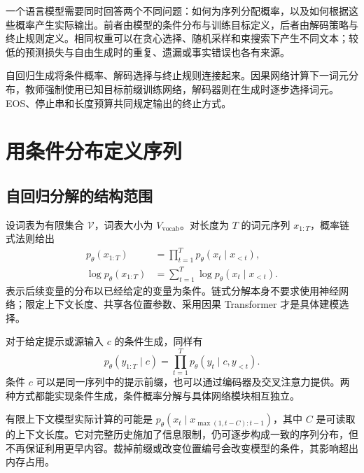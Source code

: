 \documentclass[../textbook.tex]{subfiles}
\begin{document}
\fi
{}

一个语言模型需要同时回答两个不同问题：如何为序列分配概率，以及如何根据这些概率产生实际输出。前者由模型的条件分布与训练目标定义，后者由解码策略与终止规则定义。相同权重可以在贪心选择、随机采样和束搜索下产生不同文本；较低的预测损失与自由生成时的重复、遗漏或事实错误也各有来源。

自回归生成将条件概率、解码选择与终止规则连接起来。因果网络计算下一词元分布，教师强制使用已知目标前缀训练网络，解码器则在生成时逐步选择词元。EOS、停止串和长度预算共同规定输出的终止方式。

\section{用条件分布定义序列}

\subsection{自回归分解的结构范围}
设词表为有限集合 $\mathcal V$，词表大小为 $V_{\mathrm{vocab}}$。对长度为 $T$ 的词元序列 $x_{1:T}$，概率链式法则给出
\begin{equation}\label{eq:ar-chain}
 \begin{aligned}
  p_\theta(x_{1:T})&=\prod_{t=1}^{T}p_\theta(x_t\mid x_{<t}),\\
  \log p_\theta(x_{1:T})&=\sum_{t=1}^{T}\log p_\theta(x_t\mid x_{<t}).
 \end{aligned}
\end{equation}
表示后续变量的分布以已经给定的变量为条件。链式分解本身不要求使用神经网络；限定上下文长度、共享各位置参数、采用因果 Transformer 才是具体建模选择。

对于给定提示或源输入 $c$ 的条件生成，同样有
\begin{equation}
 p_\theta(y_{1:T}\mid c)=\prod_{t=1}^{T}p_\theta(y_t\mid c,y_{<t}).\label{eq:ar-conditional}
\end{equation}
条件 $c$ 可以是同一序列中的提示前缀，也可以通过编码器及交叉注意力提供。两种方式都能实现条件生成，条件概率分解与具体网络模块相互独立。

有限上下文模型实际计算的可能是 $p_\theta(x_t\mid x_{\max(1,t-C):t-1})$，其中 $C$ 是可读取的上下文长度。它对完整历史施加了信息限制，仍可逐步构成一致的序列分布，但不再保证利用更早内容。裁掉前缀或改变位置编号会改变模型的条件，其影响超出内存占用。
\end{document}

